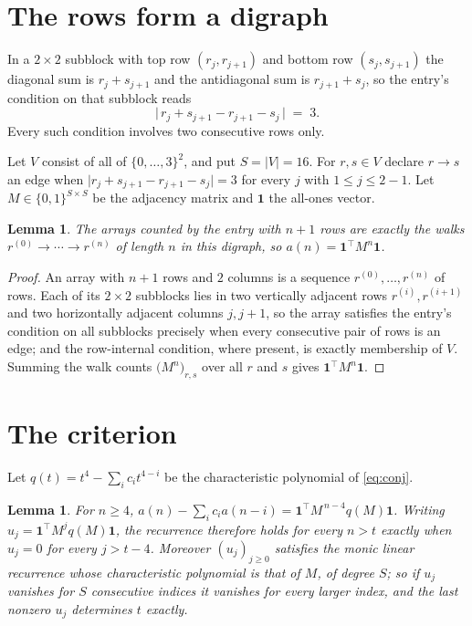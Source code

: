 \documentclass[11pt,a4paper]{article}
\theoremstyle{plain}
\newtheorem{lemma}[theorem]{Lemma}
\theoremstyle{definition}
\begin{document}
\section{The rows form a digraph}

In a $2\times2$ subblock with top row $(r_j,r_{j+1})$ and bottom row $(s_j,s_{j+1})$ the
diagonal sum is $r_j+s_{j+1}$ and the antidiagonal sum is $r_{j+1}+s_j$, so the entry's
condition on that subblock reads
\[
\bigl|\,r_j+s_{j+1}-r_{j+1}-s_j\,\bigr|\;=\;3.
\]
Every such condition involves two consecutive rows only.

Let $V$ consist of all of $\{0,\dots,3\}^{2}$, and put $S=|V|=16$. For $r,s\in V$ declare $r\to s$ an edge
when $\bigl|r_j+s_{j+1}-r_{j+1}-s_j\bigr|=3$ for every $j$ with
$1\le j\le2-1$. Let $M\in\{0,1\}^{S\times S}$ be the adjacency matrix and $\mathbf{1}$
the all-ones vector.

\begin{lemma}\label{lem:walk}
The arrays counted by the entry with $n+1$ rows are exactly the walks
$r^{(0)}\to\cdots\to r^{(n)}$ of length $n$ in this digraph, so
$a(n)=\mathbf{1}^{\!\top}M^{n}\mathbf{1}$.
\end{lemma}

\begin{proof}
An array with $n+1$ rows and $2$ columns is a sequence $r^{(0)},\dots,r^{(n)}$ of
rows. Each of its $2\times2$ subblocks lies in two vertically adjacent rows
$r^{(i)},r^{(i+1)}$ and two horizontally adjacent columns $j,j+1$, so the array satisfies
the entry's condition on all subblocks precisely when every consecutive pair of rows is an
edge; and the row-internal condition, where present, is exactly membership of $V$. Summing
the walk counts $\bigl(M^{n}\bigr)_{r,s}$ over all $r$ and $s$ gives
$\mathbf{1}^{\!\top}M^{n}\mathbf{1}$.
\end{proof}

\section{The criterion}

Let $q(t)=t^{4}-\sum_i c_i t^{4-i}$ be the characteristic polynomial of
\eqref{eq:conj}.

\begin{lemma}\label{lem:crit}
For $n\ge4$,
$a(n)-\sum_i c_i a(n-i)=\mathbf{1}^{\!\top}M^{\,n-4}q(M)\mathbf{1}$. Writing
$u_j=\mathbf{1}^{\!\top}M^{j}q(M)\mathbf{1}$, the recurrence therefore holds for every
$n>t$ exactly when $u_j=0$ for every $j>t-4$. Moreover $(u_j)_{j\ge0}$ satisfies the
monic linear recurrence whose characteristic polynomial is that of $M$, of degree $S$; so
if $u_j$ vanishes for $S$ consecutive indices it vanishes for every larger index, and the
last nonzero $u_j$ determines $t$ exactly.
\end{lemma}
\end{document}
